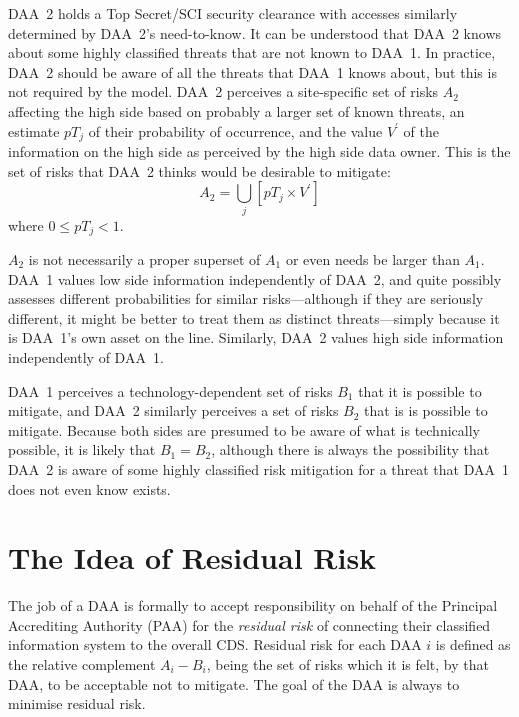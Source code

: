 \documentclass{llncs}
\begin{document}
DAA~2 holds a Top Secret/SCI security clearance with accesses similarly determined
by DAA~2's need-to-know.  It can be understood that DAA~2 knows about
some highly classified
threats that are not known to DAA~1.  In practice, DAA~2 should be aware
of all the threats that DAA~1 knows about, but this is not required by
the model.  DAA~2 perceives a site-specific set of risks $A_2$ affecting
the high side based on probably a larger set of known threats, an estimate
$pT_j$
of their probability of occurrence, and the value $V^\prime$ of the information on the
high side as perceived by the high side data owner.  This is the set of
risks that DAA~2 thinks would be desirable to mitigate:
\begin{equation}
A_2 = \bigcup_j[pT_j\times V^\prime]
\end{equation} where $0 \leq pT_j < 1$.

$A_2$ is not necessarily a proper superset of $A_1$ or even needs be
larger than $A_1$.
DAA~1 values low side information independently of DAA~2, and quite
possibly assesses different probabilities for similar risks---although if
they are seriously different, it might be better to treat them as distinct
threats---simply because it is DAA~1's own asset on the line.  Similarly, DAA~2
values high side information independently of DAA~1.

DAA~1 perceives a technology-dependent set of risks $B_1$ that it is
possible to mitigate, and DAA~2 similarly perceives a set of risks $B_2$
that is is possible to mitigate.
Because both sides are presumed to be aware of what is technically
possible, it is likely that $B_1 = B_2$, although there is always the
possibility that DAA~2 is aware of some highly classified risk mitigation
for a threat that DAA~1 does not even know exists.

\section{The Idea of Residual Risk}

The job of a DAA
is formally to accept responsibility on behalf of the Principal Accrediting
Authority (PAA) for the \emph{residual risk} of connecting their classified information system
to the overall CDS.  Residual risk for each DAA $i$ is defined as the relative complement
$A_i-B_i$, being the set of risks which it is felt, by that DAA, to be acceptable
not to mitigate.  The goal of the DAA is always to minimise residual risk.
\end{document}
